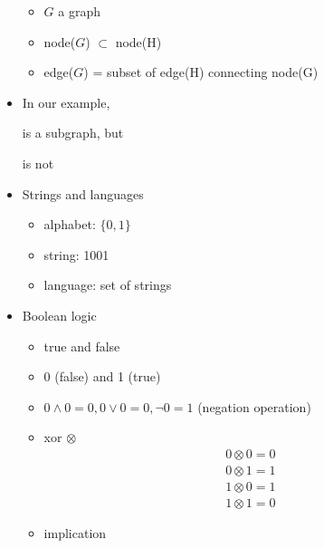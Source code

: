 \begin{frame}[allowframebreaks]
\begin{itemize}
\begin{itemize}
\item $G$ a graph
\item node($G$) $\subset$ node(H)
\item edge($G$) = subset of edge(H) connecting node(G)
\end{itemize}
\item [] In our example,
  \begin{center}
\end{center}
is a subgraph, but
  \begin{center}
\end{center}
is not
\item Strings and languages
  \begin{itemize}
  \item alphabet: $\{0,1\}$
  \item string: 1001
  \item language: set of strings
  \end{itemize}
\item Boolean logic
  \begin{itemize}
  \item true and false
  \item 0 (false) and 1 (true)
  \item $0 \wedge 0 = 0, 0 \vee 0 = 0, \neg 0=1$ (negation operation)
  \item xor $\otimes$
    \begin{gather*}
      0 \otimes 0 = 0\\
0\otimes 1 = 1\\
1 \otimes 0 = 1\\
1\otimes 1 = 0
    \end{gather*}
  \item implication


\end{itemize}
\end{itemize}
\end{frame}
